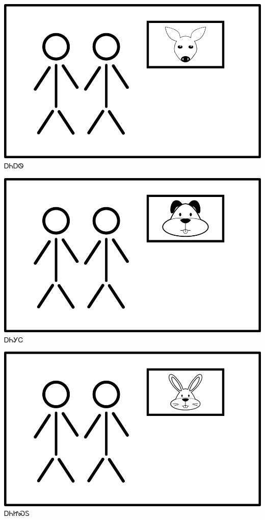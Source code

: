 \documentclass[avery5371,frame]{flashcards}%
\begin{document}
\begin{flashcard}{
\includegraphics[width=0.95\columnwidth,height=.51\columnwidth,keepaspectratio]{../artwork/flags/aniahwi-flag}
}
\Huge ᎠᏂᎠᏫ
\end{flashcard}
\begin{flashcard}{
\includegraphics[width=0.95\columnwidth,height=.51\columnwidth,keepaspectratio]{../artwork/flags/anigihli-flag}
}
\Huge ᎠᏂᎩᏟ
\end{flashcard}
\begin{flashcard}{
\includegraphics[width=0.95\columnwidth,height=.51\columnwidth,keepaspectratio]{../artwork/flags/anijisdu-flag}
}
\Huge ᎠᏂᏥᏍᏚ
\end{flashcard}
\end{document}
